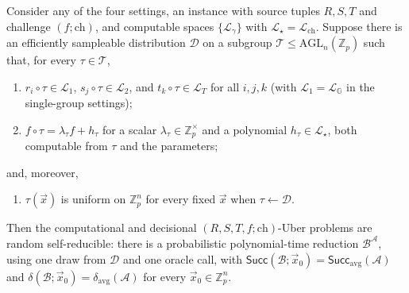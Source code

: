 \documentclass{aicr-solution}
\newcommand{\G}{\mathbb{G}}
\newcommand{\Zp}{\mathbb{Z}_p}
\newcommand{\Zpx}{\mathbb{Z}_p^{\times}}
\newcommand{\vx}{\vec{x}}
\newcommand{\Succ}{\mathsf{Succ}}
\newcommand{\LL}{\mathcal{L}}
\newcommand{\AGL}{\mathrm{AGL}}
\newcommand{\ch}{\mathrm{ch}}
\begin{document}
\begin{theorem}
\label{thm:master}
Consider any of the four settings, an instance with source tuples $R,S,T$ and challenge
$(f;\ch)$, and computable spaces $\{\LL_\gamma\}$ with $\LL_\star=\LL_{\ch}$. Suppose there
is an efficiently sampleable distribution $\mathcal D$ on a subgroup
$\mathcal T\le\AGL_n(\Zp)$ such that, for every $\tau\in\mathcal T$,
\begin{enumerate}[label=\textup{(C\arabic*)},leftmargin=3.4em,itemsep=3pt]
  \item $r_i\circ\tau\in\LL_1$, $s_j\circ\tau\in\LL_2$, and $t_k\circ\tau\in\LL_T$ for all
        $i,j,k$ (with $\LL_1=\LL_{\G}$ in the single-group settings);
  \item $f\circ\tau=\lambda_\tau f+h_\tau$ for a scalar $\lambda_\tau\in\Zpx$ and a
        polynomial $h_\tau\in\LL_\star$, both computable from $\tau$ and the parameters;
\end{enumerate}
and, moreover,
\begin{enumerate}[label=\textup{(C\arabic*)},leftmargin=3.4em,start=3]
  \item $\tau(\vx)$ is uniform on $\Zp^{n}$ for every fixed $\vx$ when $\tau\leftarrow\mathcal D$.
\end{enumerate}
Then the computational and decisional $(R,S,T,f;\ch)$-Uber problems are random
self-reducible: there is a probabilistic polynomial-time reduction $\mathcal B^{\mathcal A}$,
using one draw from $\mathcal D$ and one oracle call, with
$\Succ(\mathcal B;\vx_0)=\Succ_{\mathrm{avg}}(\mathcal A)$ and
$\delta(\mathcal B;\vx_0)=\delta_{\mathrm{avg}}(\mathcal A)$ for every $\vx_0\in\Zp^{n}$.
\end{theorem}
\end{document}
